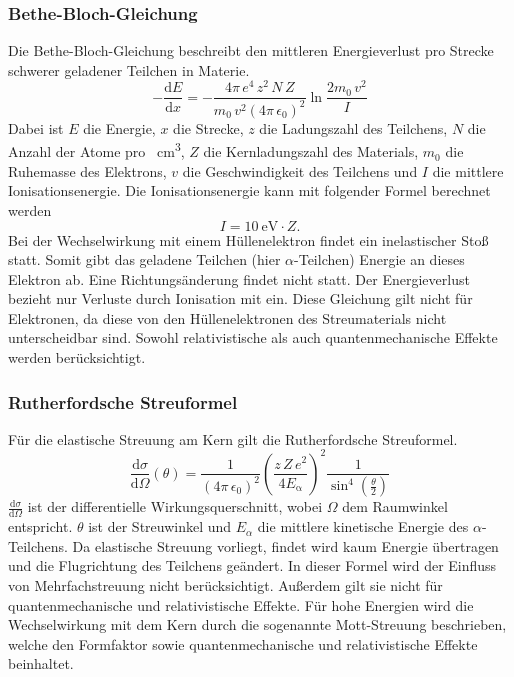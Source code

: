 \subsubsection{Bethe-Bloch-Gleichung}
Die Bethe-Bloch-Gleichung beschreibt den mittleren Energieverlust pro Strecke schwerer geladener Teilchen in Materie.
\begin{equation}
  \label{eqn:bethe}
   -\frac{\mathrm{d}E}{\mathrm{d}x}=-\frac{4\pi\,e^4\,z^2\,N\,Z}{m_0\, v^2(4\pi\,\epsilon_0)^2} \ln \frac{2m_0\,v^2}{I}
\end{equation}
Dabei ist $E$ die Energie, $x$ die Strecke, $z$ die Ladungszahl des Teilchens, $N$ die Anzahl der Atome pro \SI{}{\cubic\centi\meter}, $Z$ die Kernladungszahl des Materials, $m_0$ die Ruhemasse des Elektrons, $v$ die Geschwindigkeit des Teilchens und $I$ die mittlere Ionisationsenergie. Die Ionisationsenergie kann mit folgender Formel berechnet werden
\begin{equation}
I= \SI{10}{\electronvolt}\cdot Z.
\end{equation}
Bei der Wechselwirkung mit einem Hüllenelektron findet ein inelastischer Stoß statt. Somit gibt das geladene Teilchen (hier $\alpha$-Teilchen) Energie an dieses Elektron ab. Eine Richtungsänderung findet nicht statt.
Der Energieverlust bezieht nur Verluste durch Ionisation mit ein. Diese Gleichung gilt nicht für Elektronen, da diese von den Hüllenelektronen des Streumaterials nicht unterscheidbar sind. Sowohl relativistische als auch quantenmechanische Effekte werden berücksichtigt.

\subsubsection{Rutherfordsche Streuformel}
Für die elastische Streuung am Kern gilt die Rutherfordsche Streuformel.
\begin{equation}
  \label{eqn:rutherford}
\frac{\mathrm{d}\sigma}{\mathrm{d}\Omega}(\theta)=\frac{1}{(4\pi\,\epsilon_0)^2}\left(\frac{z\,Z\,e^2}{4E_\mathrm{\alpha}}\right)^2 \frac{1}{\sin^4\left(\frac{\theta}{2}\right)}
\end{equation}
$\frac{\mathrm{d}\sigma}{\mathrm{d}\Omega}$ ist der differentielle Wirkungsquerschnitt, wobei $\Omega$ dem Raumwinkel entspricht. $\theta$ ist der Streuwinkel und $E_{\alpha}$ die mittlere kinetische Energie des $\alpha$-Teilchens. Da elastische Streuung vorliegt, findet wird kaum Energie übertragen und die Flugrichtung des Teilchens geändert.
In dieser Formel wird der Einfluss von Mehrfachstreuung nicht berücksichtigt. Außerdem gilt sie nicht für quantenmechanische und relativistische Effekte. Für hohe Energien wird die
Wechselwirkung mit dem Kern durch die sogenannte Mott-Streuung beschrieben, welche den Formfaktor sowie quantenmechanische und relativistische Effekte beinhaltet.
